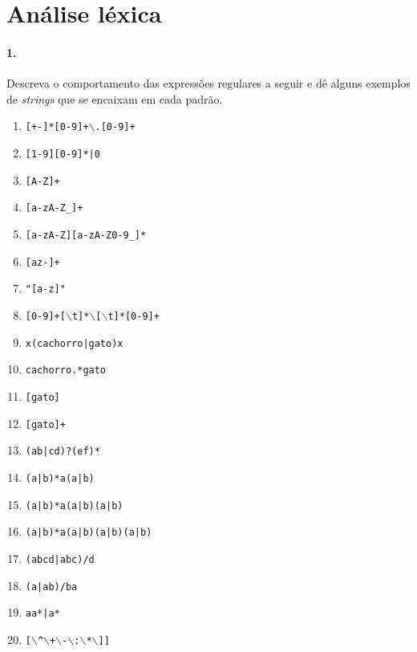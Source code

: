 \section*{Análise léxica}

\paragraph{1.} Descreva o comportamento das expressões regulares a
seguir e dê alguns exemplos de {\it strings\/} que se encaixam em cada
padrão.

\begin{enumerate}
\item {\tt [+-]*[0-9]+$\backslash$.[0-9]+}

\item {\tt [1-9][0-9]*|0}

\item {\tt [A-Z]+}

\item {\tt [a-zA-Z\_]+}

\item {\tt [a-zA-Z][a-zA-Z0-9\_]*}

\item {\tt [az-]+}

\item {\tt "[a-z]"}

\item {\tt [0-9]+[}$\backslash${\tt t]*}$\backslash${\tt *[}$\backslash${\tt t]*[0-9]+}

\item {\tt x(cachorro|gato)x}

\item {\tt cachorro.*gato}

\item {\tt [gato]}

\item {\tt [gato]+}

\item {\tt (ab|cd)?(ef)*}

\item {\tt (a|b)*a(a|b)}

\item {\tt (a|b)*a(a|b)(a|b)}

\item {\tt (a|b)*a(a|b)(a|b)(a|b)}

\item {\tt (abcd|abc)/d}

\item {\tt (a|ab)/ba}

\item {\tt aa*|a*}

\item {\tt [$\backslash$\^{}$\backslash$+$\backslash$-$\backslash$:$\backslash$*$\backslash$]]}
\end{enumerate}

